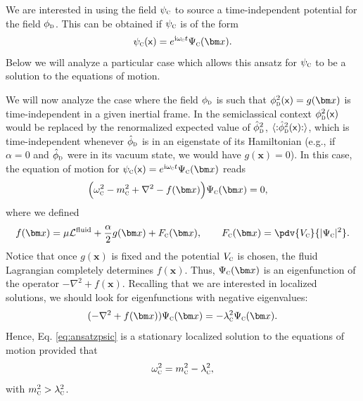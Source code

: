 \documentclass[letterpaper,12pt,titlepage,oneside,final]{book}
\newcommand{\normord}[1]{\vcentcolon\mathrel{#1}\vcentcolon}
\providecommand{\vcentcolon}{\mathrel{\mathop{:}}}
\newcommand{\mf}{\mathsf}%
\newcommand{\ii}{\mathrm{i}}
\newcommand{\tc}[1]{\textsc{#1}}
\begin{document}
We are interested in using the field $\psi_\tc{c}$ to source a time-independent potential for the field $\phi_\tc{d}$. This can be obtained if $\psi_\tc{c}$ is of the form
\begin{equation}\label{eq:ansatzpsic}
    \psi_\tc{c}(\mf x) = e^{\ii \omega_\tc{c} t}\Psi_\tc{c}(\bm x).
\end{equation}
Below we will analyze a particular case which allows this ansatz for $\psi_\tc{c}$ to be a solution to the equations of motion.

We will now analyze the case where the field $\phi_\tc{d}$ is such that $\phi_\tc{d}^2(\mf x) = g(\bm x)$ is time-independent in a given inertial frame. In the semiclassical context $\phi_\tc{d}^2(\mf x)$ would be replaced by the renormalized expected value of $\hat{\phi}_\tc{d}^2$,  $\langle \normord{\hat{\phi}_\tc{d}^2(\mf x)}\rangle$, which is time-independent whenever $\hat{\phi}_\tc{d}$ is in an eigenstate of its Hamiltonian (e.g., if $\alpha = 0$ and $\hat{\phi}_\tc{d}$ were in its vacuum state, we would have $g(\bm x) = 0$).  In this case, the equation of motion for $\psi_\tc{c}(\mf x) = e^{\ii \omega_\tc{c} t}\Psi_\tc{c}(\bm x)$ reads
\begin{equation}\begin{aligned}
    \Big(\omega_\tc{c}^2 - m_\tc{c}^2& + \nabla^2 - f(\bm x)\Big)\Psi_\tc{c}(\bm x) = 0,
    \end{aligned}
\end{equation}
where we defined
\begin{equation}\label{eq:f}
    f(\bm x) = \mu \mathcal{L}^\textrm{fluid} + \frac{\alpha}{2}g(\bm x) + F_\tc{c}(\bm x), \quad \quad F_\tc{c}(\bm x) = \pdv{V_\tc{c}}{|\Psi_\tc{c}|^2}.
\end{equation}
Notice that once $g(\bm x)$ is fixed and the potential $V_\tc{c}$ is chosen, the fluid Lagrangian completely determines $f(\bm x)$. Thus, $\Psi_\tc{c}(\bm x)$ is an eigenfunction of the operator \mbox{$-\nabla^2 + f(\bm x)$}. Recalling that we are interested in localized solutions, we should
look for eigenfunctions with negative eigenvalues:
\begin{equation}
    (-\nabla^2 + f(\bm x)) \Psi_\tc{c}(\bm x)  = -\lambda_\tc{c}^2 \Psi_\tc{c}(\bm x){.}
    \label{potential f}
\end{equation}
Hence, Eq. \eqref{eq:ansatzpsic} is a stationary localized 
solution to the equations of motion provided that
\begin{equation}
    \omega_\tc{c}^2 = m_\tc{c}^2 - \lambda_\tc{c}^2,
    \label{frequency}
\end{equation}
with $m_\tc{c}^2 > \lambda_\tc{c}^2$. 
\end{document}
